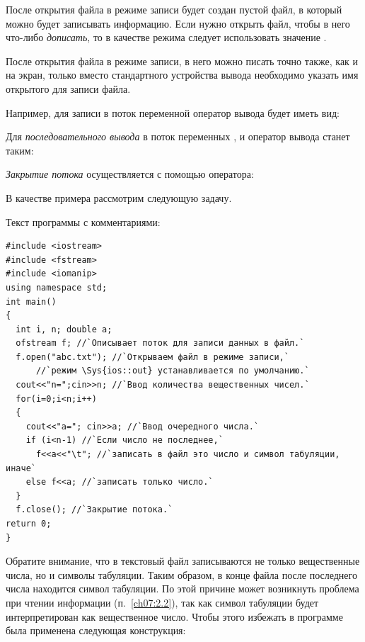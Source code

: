 После открытия файла в режиме записи будет создан пустой файл, в который можно будет записывать информацию. Если нужно
открыть файл, чтобы в него что-либо \emph{дописать}, то в качестве режима следует использовать
значение .

После открытия файла в режиме записи, в него можно писать точно также, как и на экран, только вместо стандартного
устройства вывода  необходимо указать имя открытого для записи файла.

Например, для записи в поток  переменной  оператор вывода будет иметь вид:


Для \emph{последовательного вывода} в поток  переменных ,
 и  оператор вывода станет таким:


\emph{Закрытие потока} осуществляется с помощью оператора:


В качестве примера рассмотрим следующую задачу.


Текст программы с комментариями:
\begin{lstlisting}
#include <iostream>
#include <fstream>
#include <iomanip>
using namespace std;
int main()
{
  int i, n; double a;
  ofstream f; //`Описывает поток для записи данных в файл.`
  f.open("abc.txt"); //`Открываем файл в режиме записи,`
      //`режим \Sys{ios::out} устанавливается по умолчанию.`
  cout<<"n=";cin>>n; //`Ввод количества вещественных чисел.`
  for(i=0;i<n;i++)
  {
    cout<<"a="; cin>>a; //`Ввод очередного числа.`
    if (i<n-1) //`Если число не последнее,`
      f<<a<<"\t"; //`записать в файл это число и символ табуляции, иначе`
    else f<<a; //`записать только число.`
  }
  f.close(); //`Закрытие потока.`
return 0;
}
\end{lstlisting}

Обратите внимание, что в текстовый файл записываются не только вещественные числа, но и символы табуляции. Таким
образом, в конце файла после последнего числа находится символ табуляции. По этой причине может возникнуть проблема при
чтении информации (п.~\ref{ch07:2.2}), так как символ табуляции будет интерпретирован как вещественное число. Чтобы этого
избежать в программе была применена следующая конструкция:


